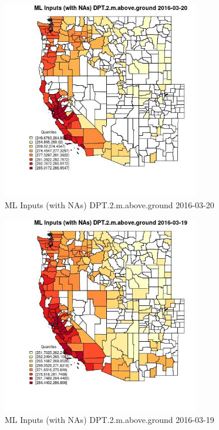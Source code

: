 \begin{figure} 
\centering  
\includegraphics[width=0.77\textwidth]{Code_Outputs/Report_ML_input_PM25_Step4_part_e_de_duplicated_aveswNAs_CountyDPT2mabovegroundMean2016-03-20_2016-03-20.jpg} 
\caption{\label{fig:Report_ML_input_PM25_Step4_part_e_de_duplicated_aveswNAsCountyDPT2mabovegroundMean2016-03-20_2016-03-20}ML Inputs (with NAs) DPT.2.m.above.ground 2016-03-20} 
\end{figure} 
 

\begin{figure} 
\centering  
\includegraphics[width=0.77\textwidth]{Code_Outputs/Report_ML_input_PM25_Step4_part_e_de_duplicated_aveswNAs_CountyDPT2mabovegroundMean2016-03-19_2016-03-19.jpg} 
\caption{\label{fig:Report_ML_input_PM25_Step4_part_e_de_duplicated_aveswNAsCountyDPT2mabovegroundMean2016-03-19_2016-03-19}ML Inputs (with NAs) DPT.2.m.above.ground 2016-03-19} 
\end{figure} 
 

